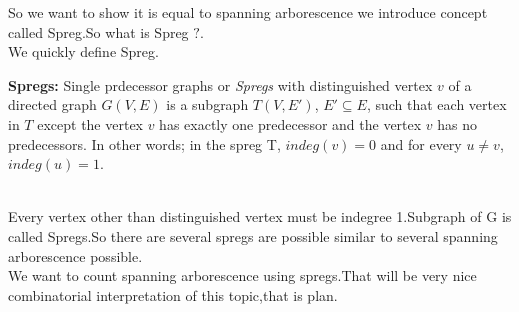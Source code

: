 So we want to show it is equal to spanning arborescence we introduce concept called Spreg.So what is Spreg $?$.\\
We quickly define Spreg.\\
\begin{definition}\textbf{Spregs:} Single prdecessor graphs or \textit{Spregs} with distinguished vertex $v$ of a directed graph $G(V,E)$ is a subgraph $T(V,E')$, $E' \subseteq E$, such that each vertex in $T$ except the vertex $v$ has exactly one predecessor and the vertex $v$ has no predecessors. In other words; in the spreg T, $indeg(v) = 0$ and for every $u \neq v$, $indeg(u)=1$.\\
\end{definition}\\
Every vertex other than distinguished vertex must be indegree 1.Subgraph of G is called Spregs.So there are several spregs are possible similar to several spanning arborescence possible.\\
We want to count spanning arborescence using spregs.That will be very nice combinatorial interpretation of this topic,that is plan.\\


